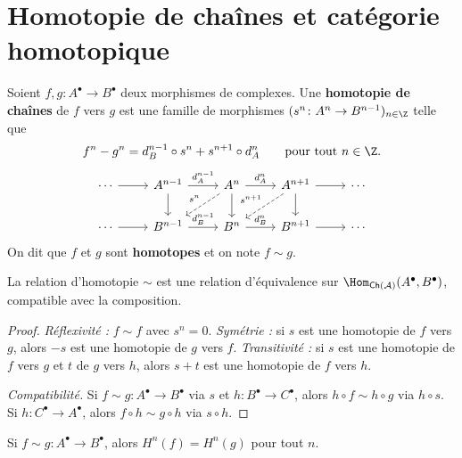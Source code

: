 \section{Homotopie de chaînes et catégorie homotopique}%
\label{sec:chain-homotopy}

\begin{definition}\label{def:chain-homotopy}
Soient $f, g \colon A^\bullet \to B^\bullet$ deux morphismes de complexes.
Une \textbf{homotopie de chaînes} de $f$ vers $g$ est une famille de
morphismes $(s^n \colon A^n \to B^{n-1})_{n \in \Z}$ telle que
\[
  f^n - g^n = d_B^{n-1} \circ s^n + s^{n+1} \circ d_A^n
  \qquad \text{pour tout } n \in \Z.
\]
\[
\begin{tikzcd}
\cdots \arrow[r]
& A^{n-1} \arrow[r, "d_A^{n-1}"] \arrow[d]
& A^n \arrow[r, "d_A^n"] \arrow[d] \arrow[dl, dashed, "s^n"']
& A^{n+1} \arrow[r] \arrow[d] \arrow[dl, dashed, "s^{n+1}"']
& \cdots \\
\cdots \arrow[r]
& B^{n-1} \arrow[r, "d_B^{n-1}"]
& B^n \arrow[r, "d_B^n"]
& B^{n+1} \arrow[r]
& \cdots
\end{tikzcd}
\]
On dit que $f$ et $g$ sont \textbf{homotopes} et on
note $f \sim g$.
\end{definition}

\begin{proposition}\label{prop:homotopy-equivalence}
La relation d'homotopie $\sim$ est une relation d'équivalence sur
$\Hom_{\mathsf{Ch}(\mathcal{A})}(A^\bullet, B^\bullet)$, compatible
avec la composition.
\end{proposition}

\begin{proof}
\emph{Réflexivité :} $f \sim f$ avec $s^n = 0$.
\emph{Symétrie :} si $s$ est une homotopie de $f$ vers $g$, alors $-s$ est
une homotopie de $g$ vers $f$.
\emph{Transitivité :} si $s$ est une homotopie de $f$ vers $g$ et $t$ de
$g$ vers $h$, alors $s + t$ est une homotopie de $f$ vers $h$.

\emph{Compatibilité.} Si $f \sim g \colon A^\bullet \to B^\bullet$
via $s$ et $h \colon B^\bullet \to C^\bullet$, alors $h \circ f \sim h \circ g$
via $h \circ s$. Si $h \colon C^\bullet \to A^\bullet$, alors
$f \circ h \sim g \circ h$ via $s \circ h$.
\end{proof}

\begin{proposition}\label{prop:homotopic-maps-cohomology}
Si $f \sim g \colon A^\bullet \to B^\bullet$, alors
$H^n(f) = H^n(g)$ pour tout $n$.
\end{proposition}

